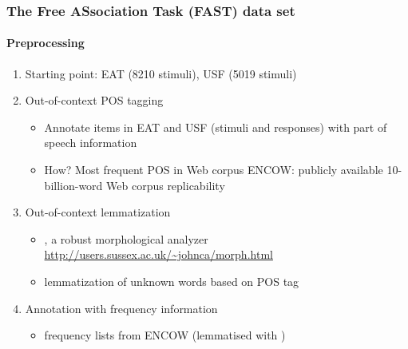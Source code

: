 \documentclass[t]{beamer} %
\begin{document}
\begin{frame}
  \frametitle{The Free ASsociation Task (FAST) data set}
  \framesubtitle{Preprocessing}

  \begin{enumerate}
  \item Starting point: EAT (8210 stimuli), USF (5019 stimuli)
    \gap
  \item<2-> Out-of-context POS tagging 
    \begin{itemize}
    \item Annotate items in EAT and USF (stimuli and responses) with part of speech information
    \item How? Most frequent POS in Web corpus ENCOW: publicly available 10-billion-word Web corpus \so replicability
    \end{itemize}
    \gap
  \item<3-> Out-of-context lemmatization    
    \begin{itemize}
    \item {}, a robust morphological analyzer \url{http://users.sussex.ac.uk/~johnca/morph.html}
    \item lemmatization of unknown words based on POS tag
    \end{itemize}
    \gap
  \item<4-> Annotation with frequency information
    \begin{itemize}
    \item frequency lists from ENCOW (lemmatised with )
    \end{itemize}
 \end{enumerate}
\end{frame}


\end{document}
